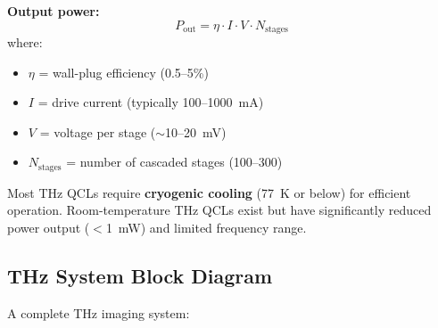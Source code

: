 \textbf{Output power:}
\begin{equation}
P_{\text{out}} = \eta \cdot I \cdot V \cdot N_{\text{stages}}
\end{equation}
where:
\begin{itemize}
\item $\eta$ = wall-plug efficiency (0.5--5\%)
\item $I$ = drive current (typically 100--1000~mA)
\item $V$ = voltage per stage ($\sim$10--20~mV)
\item $N_{\text{stages}}$ = number of cascaded stages (100--300)
\end{itemize}

\begin{warningbox}
Most THz QCLs require \textbf{cryogenic cooling} (77~K or below) for efficient operation. Room-temperature THz QCLs exist but have significantly reduced power output ($<$1~mW) and limited frequency range.
\end{warningbox}

\subsection{THz System Block Diagram}

A complete THz imaging system:

